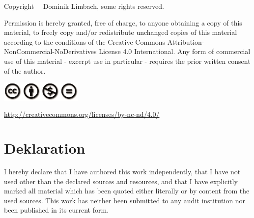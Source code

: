 \documentclass[
    12pt,
    a4paper,
	chapterprefix=false,
	parskip=full,
	headings=normal,
	numbers=noenddot
]{scrreprt}
\begin{document}
\clearpage
\vspace*{\fill}
\small
\begin{center}

	Copyright \textcopyright \ \the\year \ Dominik Limbach, some rights reserved.
	
	\begin{minipage}{0.85\textwidth}
		Permission is hereby granted, free of charge, to anyone obtaining a copy of this material, to freely copy and/or redistribute unchanged copies of this material according to the conditions of the Creative Commons Attribution-NonCommercial-NoDerivatives License 4.0 International. Any form of commercial use of this material - excerpt use in particular - requires the prior written consent of the author.
	\end{minipage}
	
	\includegraphics[width=4cm]{images/cc_by_nc_nd}
	
	\href{http://creativecommons.org/licenses/by-nc-nd/4.0/}{http://creativecommons.org/licenses/by-nc-nd/4.0/}

\end{center}
\normalsize
\thispagestyle{empty}
\clearpage




%




%


\newpage

\chapter*{Deklaration}

I hereby declare that I have authored this work independently, that I have not used other than the declared sources and resources, and that I have explicitly marked all material which has been quoted either literally or by content from the used sources. This work has neither been submitted to any audit institution nor been published in its current form.\\
\end{document}

